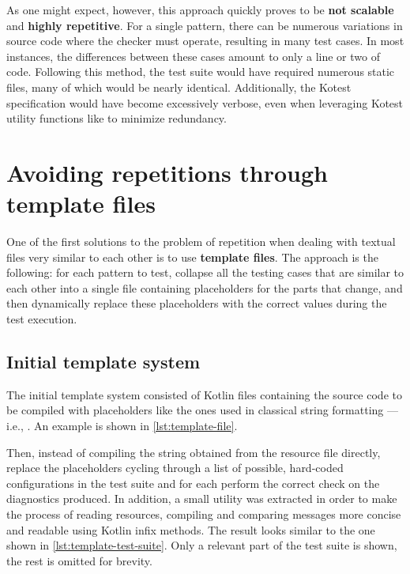 \documentclass[12pt,a4paper,openright,twoside]{book}
\begin{document}
As one might expect, however, this approach quickly proves to be \textbf{not
scalable} and \textbf{highly repetitive}. For a single pattern, there can be
numerous variations in source code where the checker must operate, resulting in
many test cases. In most instances, the differences between these cases amount
to only a line or two of code.
%
Following this method, the test suite would have required numerous static files,
many of which would be nearly identical. Additionally, the Kotest specification
would have become excessively verbose, even when leveraging Kotest utility
functions like  to minimize redundancy.

\section{Avoiding repetitions through template files}

One of the first solutions to the problem of repetition when dealing with
textual files very similar to each other is to use \textbf{template files}. The
approach is the following: for each pattern to test, collapse all the testing
cases that are similar to each other into a single file containing placeholders
for the parts that change, and then dynamically replace these placeholders with
the correct values during the test execution.

\subsection{Initial template system}

The initial template system consisted of Kotlin files containing the
source code to be compiled with placeholders like the ones used in classical
string formatting --- i.e., . An example is shown in 
\cref{lst:template-file}. 
%

%
Then, instead of compiling the string obtained from the resource file directly,
replace the placeholders cycling through a list of possible, hard-coded
configurations in the test suite and for each perform the correct check on the
diagnostics produced.
%
In addition, a small utility was extracted in order to make the process of
reading resources, compiling and comparing messages more concise and readable
using Kotlin infix methods. The result looks similar to the one shown in
\cref{lst:template-test-suite}. Only a relevant part of the test suite is shown,
the rest is omitted for brevity.
\end{document}
